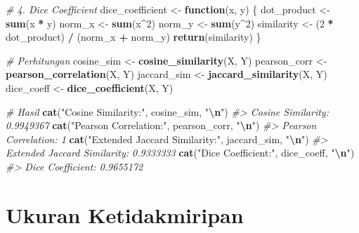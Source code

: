 \documentclass[
  oneside]{book}
\newenvironment{Shaded}{\begin{snugshade}}{\end{snugshade}}
\newcommand{\CommentTok}[1]{\textcolor[rgb]{0.56,0.35,0.01}{\textit{#1}}}
\newcommand{\ControlFlowTok}[1]{\textcolor[rgb]{0.13,0.29,0.53}{\textbf{#1}}}
\newcommand{\DecValTok}[1]{\textcolor[rgb]{0.00,0.00,0.81}{#1}}
\newcommand{\FunctionTok}[1]{\textcolor[rgb]{0.13,0.29,0.53}{\textbf{#1}}}
\newcommand{\NormalTok}[1]{#1}
\newcommand{\OtherTok}[1]{\textcolor[rgb]{0.56,0.35,0.01}{#1}}
\newcommand{\SpecialCharTok}[1]{\textcolor[rgb]{0.81,0.36,0.00}{\textbf{#1}}}
\newcommand{\StringTok}[1]{\textcolor[rgb]{0.31,0.60,0.02}{#1}}
\begin{document}
\begin{Shaded}
\begin{Highlighting}[]
\CommentTok{\# 4. Dice Coefficient}
\NormalTok{dice\_coefficient }\OtherTok{\textless{}{-}} \ControlFlowTok{function}\NormalTok{(x, y) \{}
\NormalTok{  dot\_product }\OtherTok{\textless{}{-}} \FunctionTok{sum}\NormalTok{(x }\SpecialCharTok{*}\NormalTok{ y)}
\NormalTok{  norm\_x }\OtherTok{\textless{}{-}} \FunctionTok{sum}\NormalTok{(x}\SpecialCharTok{\^{}}\DecValTok{2}\NormalTok{)}
\NormalTok{  norm\_y }\OtherTok{\textless{}{-}} \FunctionTok{sum}\NormalTok{(y}\SpecialCharTok{\^{}}\DecValTok{2}\NormalTok{)}
\NormalTok{  similarity }\OtherTok{\textless{}{-}}\NormalTok{ (}\DecValTok{2} \SpecialCharTok{*}\NormalTok{ dot\_product) }\SpecialCharTok{/}\NormalTok{ (norm\_x }\SpecialCharTok{+}\NormalTok{ norm\_y)}
  \FunctionTok{return}\NormalTok{(similarity)}
\NormalTok{\}}

\CommentTok{\# Perhitungan}
\NormalTok{cosine\_sim }\OtherTok{\textless{}{-}} \FunctionTok{cosine\_similarity}\NormalTok{(X, Y)}
\NormalTok{pearson\_corr }\OtherTok{\textless{}{-}} \FunctionTok{pearson\_correlation}\NormalTok{(X, Y)}
\NormalTok{jaccard\_sim }\OtherTok{\textless{}{-}} \FunctionTok{jaccard\_similarity}\NormalTok{(X, Y)}
\NormalTok{dice\_coeff }\OtherTok{\textless{}{-}} \FunctionTok{dice\_coefficient}\NormalTok{(X, Y)}

\CommentTok{\# Hasil}
\FunctionTok{cat}\NormalTok{(}\StringTok{"Cosine Similarity:"}\NormalTok{, cosine\_sim, }\StringTok{"}\SpecialCharTok{\textbackslash{}n}\StringTok{"}\NormalTok{)}
\CommentTok{\#\textgreater{} Cosine Similarity: 0.9949367}
\FunctionTok{cat}\NormalTok{(}\StringTok{"Pearson Correlation:"}\NormalTok{, pearson\_corr, }\StringTok{"}\SpecialCharTok{\textbackslash{}n}\StringTok{"}\NormalTok{)}
\CommentTok{\#\textgreater{} Pearson Correlation: 1}
\FunctionTok{cat}\NormalTok{(}\StringTok{"Extended Jaccard Similarity:"}\NormalTok{, jaccard\_sim, }\StringTok{"}\SpecialCharTok{\textbackslash{}n}\StringTok{"}\NormalTok{)}
\CommentTok{\#\textgreater{} Extended Jaccard Similarity: 0.9333333}
\FunctionTok{cat}\NormalTok{(}\StringTok{"Dice Coefficient:"}\NormalTok{, dice\_coeff, }\StringTok{"}\SpecialCharTok{\textbackslash{}n}\StringTok{"}\NormalTok{)}
\CommentTok{\#\textgreater{} Dice Coefficient: 0.9655172}
\end{Highlighting}
\end{Shaded}

\section{Ukuran Ketidakmiripan}\label{ukuran-ketidakmiripan}
\end{document}
